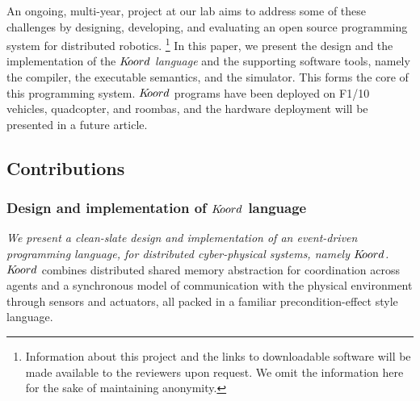 An ongoing, multi-year, project at our lab aims to address some of these challenges by designing, developing, and evaluating an open source programming system for distributed robotics. \footnote{Information about this project and the links to downloadable software will be made available to the reviewers upon request. We omit the information here for the sake of maintaining anonymity.} In this paper, we present the design and the implementation of the  {\em $K\kern-2pt oord$ language} and the supporting software tools, namely the compiler, the \K executable semantics, and the simulator. This forms the  core of this programming system. $K\kern-2pt oord$ programs have been deployed on F1/10 vehicles, quadcopter, and roombas, and the hardware deployment will be presented in a future article. 





%
%
\subsection{Contributions}
\subsubsection{Design and implementation of $K\kern-2pt oord$ language}
{\em We present a clean-slate design and implementation of an event-driven programming language, for distributed cyber-physical systems, namely $K\kern-2pt oord$.} 
%
$K\kern-2pt oord$ combines distributed shared memory abstraction for coordination across agents and a synchronous model of communication with the physical environment through sensors and actuators, all packed in a familiar precondition-effect style language.
%

